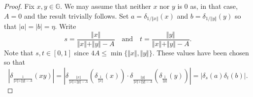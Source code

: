 \documentclass[11pt]{amsart}
\theoremstyle{definition}
\numberwithin{theorem}{section} \numberwithin{equation}{section}
\begin{document}
\begin{proof}
Fix $x,y \in \mathbb{G}$.
We may assume that neither $x$ nor $y$ is 0
as, in that case, $A=0$ and the result trivially follows. 
Set $a = \delta_{1 / \Vert x \Vert} (x)$ and $b = \delta_{ 1 / \Vert y \Vert} (y)$
so that $|a|=|b|=\eta$.
Write 
$$
s = \frac{\Vert x \Vert}{\Vert x \Vert + \Vert y \Vert - A} 
\quad
\text{and}
\quad
t = \frac{\Vert y \Vert}{\Vert x \Vert + \Vert y \Vert - A}. 
$$
Note that $s,t \in [0,1]$ since $4A \leq \min \{ \Vert x \Vert, \Vert y \Vert \}$. 
These values have been chosen so that
$$
\left| \delta_{\frac{1}{\Vert x \Vert + \Vert y \Vert - A}}(xy) \right|
=
\left| \delta_{\frac{\Vert x \Vert}{\Vert x \Vert + \Vert y \Vert-A}} \left( \delta_{\frac{1}{\Vert x \Vert}} (x) \right) 
\cdot \delta_{\frac{\Vert y \Vert}{\Vert x \Vert + \Vert y \Vert-A}} \left( \delta_{\frac{1}{\Vert y \Vert}} (y) \right) \right|
=\left| \delta_{s} \left( a \right) \delta_{t} \left( b \right) \right|.
$$



\end{proof}
\end{document}
